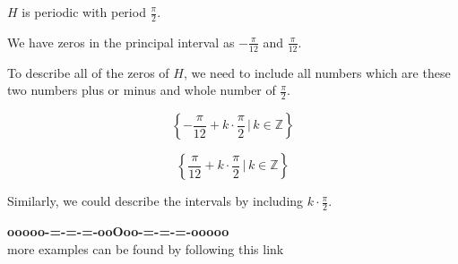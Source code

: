 \documentclass{ximera}
\begin{document}
$H$ is periodic with period $\frac{\pi}{2}$. 



We have zeros in the principal interval as $-\frac{\pi}{12}$ and $\frac{\pi}{12}$. 


To describe all of the zeros of $H$, we need to include all numbers which are these two numbers plus or minus and whole number of $\frac{\pi}{2}$. 



\[
\left\{  -\frac{\pi}{12} + k  \cdot \frac{\pi}{2}  \, | \,  k \in \mathbb{Z}         \right\}
\]



\[
\left\{  \frac{\pi}{12} + k  \cdot \frac{\pi}{2}  \, | \,  k \in \mathbb{Z}         \right\}
\]




Similarly, we could describe the intervals by including $k  \cdot \frac{\pi}{2} $. 


















\begin{center}
\textbf{\textcolor{green!50!black}{ooooo-=-=-=-ooOoo-=-=-=-ooooo}} \\

more examples can be found by following this link\\ 

\end{center}
\end{document}
